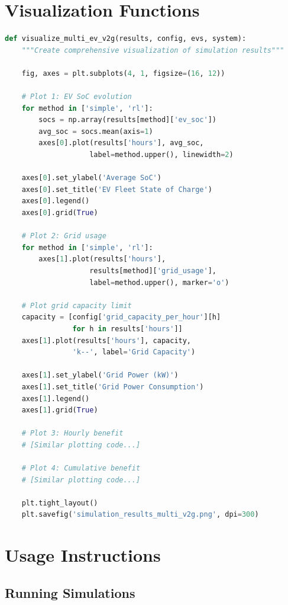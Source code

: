 \section{Visualization Functions}
\label{app:visualization}

\begin{lstlisting}[language=Python,caption={Results visualization (simplified)}]
def visualize_multi_ev_v2g(results, config, evs, system):
    """Create comprehensive visualization of simulation results"""
    
    fig, axes = plt.subplots(4, 1, figsize=(16, 12))
    
    # Plot 1: EV SoC evolution
    for method in ['simple', 'rl']:
        socs = np.array(results[method]['ev_soc'])
        avg_soc = socs.mean(axis=1)
        axes[0].plot(results['hours'], avg_soc, 
                    label=method.upper(), linewidth=2)
    
    axes[0].set_ylabel('Average SoC')
    axes[0].set_title('EV Fleet State of Charge')
    axes[0].legend()
    axes[0].grid(True)
    
    # Plot 2: Grid usage
    for method in ['simple', 'rl']:
        axes[1].plot(results['hours'], 
                    results[method]['grid_usage'],
                    label=method.upper(), marker='o')
    
    # Plot grid capacity limit
    capacity = [config['grid_capacity_per_hour'][h] 
                for h in results['hours']]
    axes[1].plot(results['hours'], capacity, 
                'k--', label='Grid Capacity')
    
    axes[1].set_ylabel('Grid Power (kW)')
    axes[1].set_title('Grid Power Consumption')
    axes[1].legend()
    axes[1].grid(True)
    
    # Plot 3: Hourly benefit
    # [Similar plotting code...]
    
    # Plot 4: Cumulative benefit
    # [Similar plotting code...]
    
    plt.tight_layout()
    plt.savefig('simulation_results_multi_v2g.png', dpi=300)
\end{lstlisting}

\section{Usage Instructions}
\label{app:usage}

\subsection{Running Simulations}

